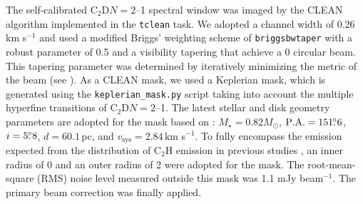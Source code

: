 \documentclass[linenumbers, twocolumn, times]{aastex631}
\newcommand{\CCH}{C$_2$H\xspace}
\newcommand{\CCD}{C$_2$D\xspace}
\begin{document}
The self-calibrated \CCD $N=2$--1 spectral window was imaged by the CLEAN algorithm \citep{Hogbom1974} implemented in the \texttt{tclean} task. We adopted a channel width of 0.26 km s$^{-1}$ and used a modified Briggs' weighting scheme of \texttt{briggsbwtaper} with a robust parameter of 0.5 and a visibility tapering that achieve a 0 circular beam. This tapering parameter was determined by iteratively minimizing the metric of the beam (see \citealt{Czekala2021}). As a CLEAN mask, we used a Keplerian mask, which is generated using the \texttt{keplerian\_mask.py} script \citep{Teague2020} taking into account the multiple hyperfine transitions of \CCD $N=2$--1. The latest stellar and disk geometry parameters are adopted for the mask based on \citet{Teague2022}: $M_\star = 0.82M_\odot$, $\mathrm{P.A.}=151\mbox{$.\!\!^\circ$}6$, $i=5\mbox{$.\!\!^\circ$}8$, $d=60.1$\,pc, and $v_\mathrm{sys}=2.84$\,km s$^{-1}$. To fully encompass the emission expected from the distribution of \CCH emission in previous studies \citep{Bergin2016}, an inner radius of 0 and an outer radius of 2 were adopted for the mask. The root-mean-square (RMS) noise level measured outside this mask was 1.1 mJy beam$^{-1}$. The primary beam correction was finally applied. 

\end{document}
